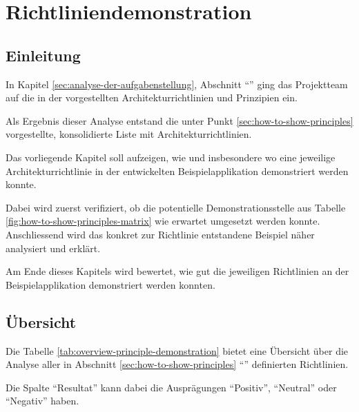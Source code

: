 \chapter{Richtliniendemonstration}
\label{sec:principle-demonstration}

\section*{Einleitung}

In Kapitel \ref{sec:analyse-der-aufgabenstellung}, Abschnitt ``'' ging das Projektteam auf die in der  vorgestellten Architekturrichtlinien und Prinzipien ein.

Als Ergebnis dieser Analyse entstand die unter Punkt \ref{sec:how-to-show-principles} vorgestellte, konsolidierte Liste mit Architekturrichtlinien.

Das vorliegende Kapitel soll aufzeigen, wie und insbesondere wo eine jeweilige Architekturrichtlinie in der entwickelten Beispielapplikation demonstriert werden konnte.

Dabei wird zuerst verifiziert, ob die potentielle Demonstrationsstelle aus Tabelle \ref{fig:how-to-show-principles-matrix} wie erwartet umgesetzt werden konnte.
Anschliessend wird das konkret zur Richtlinie entstandene Beispiel näher analysiert und erklärt.

Am Ende dieses Kapitels wird bewertet, wie gut die jeweiligen Richtlinien an der Beispielapplikation demonstriert werden konnten.

\newpage
\section{Übersicht}

Die Tabelle \ref{tab:overview-principle-demonstration} bietet eine Übersicht über die Analyse aller in Abschnitt \ref{sec:how-to-show-principles} ``'' definierten Richtlinien.

Die Spalte ``Resultat'' kann dabei die Ausprägungen ``Positiv'', ``Neutral'' oder ``Negativ'' haben.

